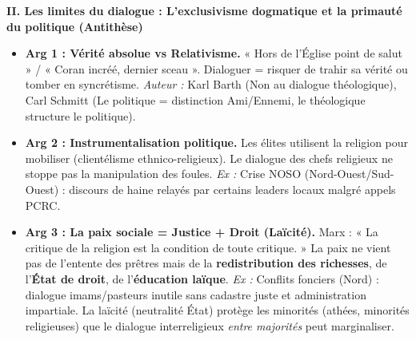 \documentclass[11pt]{article}
\newcommand{\cle}[1]{{\popxbold\color{popdark}#1}}
\begin{document}
\begin{exoresolu}
\textbf{II. Les limites du dialogue : L'exclusivisme dogmatique et la primauté du politique (Antithèse)}
\begin{itemize}
    \item \textbf{Arg 1 : Vérité absolue vs Relativisme.} « Hors de l'Église point de salut » / « Coran incréé, dernier sceau ». Dialoguer = risquer de trahir sa vérité ou tomber en syncrétisme. \emph{Auteur :} Karl Barth (Non au dialogue théologique), Carl Schmitt (Le politique = distinction Ami/Ennemi, le théologique structure le politique).
    \item \textbf{Arg 2 : Instrumentalisation politique.} Les élites utilisent la religion pour mobiliser (clientélisme ethnico-religieux). Le dialogue des chefs religieux ne stoppe pas la manipulation des foules. \emph{Ex :} Crise NOSO (Nord-Ouest/Sud-Ouest) : discours de haine relayés par certains leaders locaux malgré appels PCRC.
    \item \textbf{Arg 3 : La paix sociale = Justice + Droit (Laïcité).} Marx : « La critique de la religion est la condition de toute critique. » La paix ne vient pas de l'entente des prêtres mais de la \textbf{redistribution des richesses}, de l'\textbf{État de droit}, de l'\textbf{éducation laïque}. \emph{Ex :} Conflits fonciers (Nord) : dialogue imams/pasteurs inutile sans cadastre juste et administration impartiale. La \cle{laïcité} (neutralité État) protège les minorités (athées, minorités religieuses) que le dialogue interreligieux \emph{entre majorités} peut marginaliser.
\end{itemize}


\end{exoresolu}
\end{document}
